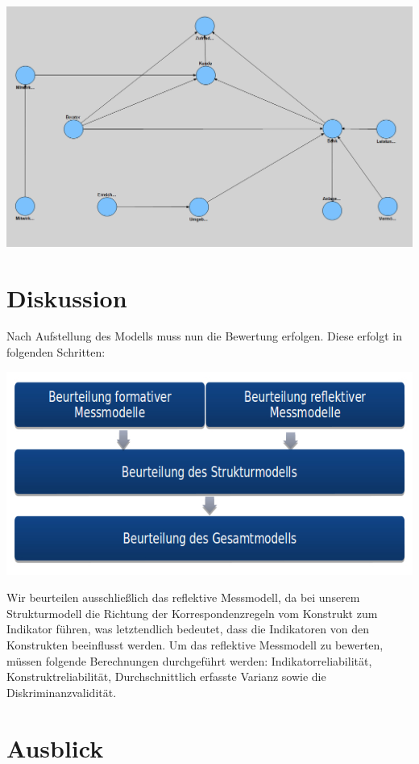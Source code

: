 \documentclass{article}\usepackage[]{graphicx}\usepackage[]{color}
\begin{document}
\hspace*{-4.8cm}\includegraphics[scale = 0.83]{figure/finalesmodell}




\section{Diskussion}%
Nach Aufstellung des Modells muss nun die Bewertung erfolgen. Diese erfolgt in folgenden Schritten:

\includegraphics[width = 1\textwidth]{figure/beurteilung}

Wir beurteilen ausschließlich das reflektive Messmodell, da bei unserem Strukturmodell die Richtung der Korrespondenzregeln vom Konstrukt zum Indikator führen, was letztendlich bedeutet, dass die Indikatoren von den Konstrukten beeinflusst werden. Um das reflektive Messmodell zu bewerten, müssen folgende Berechnungen durchgeführt werden: Indikatorreliabilität, Konstruktreliabilität, Durchschnittlich erfasste Varianz sowie die Diskriminanzvalidität.

\section{Ausblick}%



\appendix
\end{document}
